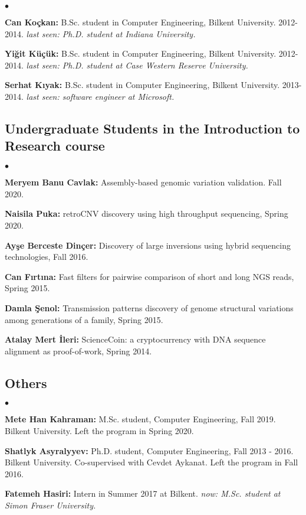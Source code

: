 \documentclass[margin,line]{res}
\newenvironment{list2}{
  \begin{list}{$\bullet$}{%
      \setlength{\itemsep}{0.1cm}
      \setlength{\parsep}{0in} \setlength{\parskip}{0in}
      \setlength{\topsep}{0in} \setlength{\partopsep}{0in} 
      \setlength{\leftmargin}{0.2in}}}{\end{list}}
\begin{document}
\begin{resume}
\begin{list2}
\item {\bf Can Koçkan:} B.Sc. student in Computer Engineering,  Bilkent University.  2012-2014. {\it last seen: Ph.D. student at Indiana University.}
\item {\bf Yiğit Küçük:} B.Sc. student in Computer Engineering,  Bilkent University. 2012-2014. {\it last seen: Ph.D. student at Case Western Reserve University.}
\item {\bf Serhat Kıyak:} B.Sc. student in Computer Engineering,  Bilkent University. 2013-2014. {\it last seen: software engineer at Microsoft.}
\end{list2}


\vspace*{-.4cm}
  \subsection{\small \sc Undergraduate Students in the Introduction to Research course}
  \begin{list2}
  \item 
  {\bf Meryem Banu Cavlak:} Assembly-based genomic variation validation. Fall 2020.
  \item
    {\bf Naisila Puka:} retroCNV discovery using high throughput sequencing, Spring 2020.
  \item
    {\bf Ayşe Berceste Dinçer:} Discovery of large inversions using hybrid sequencing technologies, Fall 2016.
  \item
    {\bf Can Fırtına:} Fast filters for pairwise comparison of short and long NGS reads, Spring 2015.
  \item
    {\bf Damla Şenol:} Transmission patterns discovery of genome structural variations among generations of a family, Spring 2015.
  \item
    {\bf Atalay Mert İleri:} ScienceCoin: a cryptocurrency with DNA sequence alignment as proof-of-work, Spring 2014.
  \end{list2}
\vspace*{-.4cm}
\subsection{\small \sc Others}
\begin{list2}
\item
  {\bf Mete Han Kahraman:} M.Sc. student, Computer Engineering, Fall 2019.  
  Bilkent University. Left the program in Spring 2020.
\item
  {\bf Shatlyk Asyralyyev:} Ph.D. student, Computer Engineering, Fall 2013 - 2016.
  Bilkent University. Co-supervised with Cevdet Aykanat. Left the program in Fall 2016.
\item
  {\bf Fatemeh Hasiri:} Intern in Summer 2017 at Bilkent.   {\it now: M.Sc. student at Simon Fraser University.}


\end{list2}
\end{resume}
\end{document}

